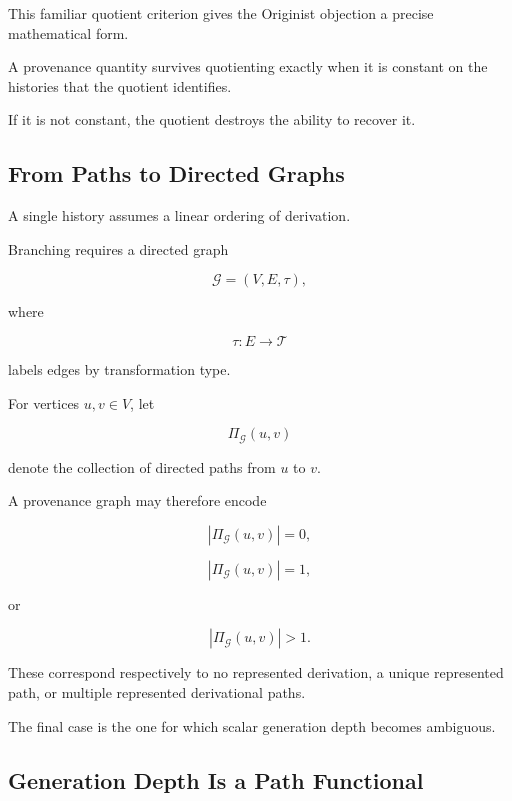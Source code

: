 \documentclass[
  11pt,
  a4paper,
  DIV=12,
  BCOR=0mm,
  parskip=half-
]{scrartcl}
\newcommand{\graphG}{\mathcal G}
\theoremstyle{definition}
\theoremstyle{plain}
\theoremstyle{remark}
\begin{document}
This familiar quotient criterion gives the Originist objection a precise
mathematical form.

A provenance quantity survives quotienting exactly when it is constant on the
histories that the quotient identifies.

If it is not constant, the quotient destroys the ability to recover it.


\subsection{From Paths to Directed Graphs}
\label{app:directed-graphs}

A single history assumes a linear ordering of derivation.

Branching requires a directed graph

\[
  \graphG=(V,E,\tau),
\]

where

\[
  \tau:E\to\mathcal T
\]

labels edges by transformation type.

For vertices \(u,v\in V\), let

\[
  \Pi_{\graphG}(u,v)
\]

denote the collection of directed paths from \(u\) to \(v\).

A provenance graph may therefore encode

\[
  |\Pi_{\graphG}(u,v)|=0,
\]

\[
  |\Pi_{\graphG}(u,v)|=1,
\]

or

\[
  |\Pi_{\graphG}(u,v)|>1.
\]

These correspond respectively to no represented derivation, a unique
represented path, or multiple represented derivational paths.

The final case is the one for which scalar generation depth becomes
ambiguous.


\subsection{Generation Depth Is a Path Functional}
\label{app:generation-depth}
\end{document}
